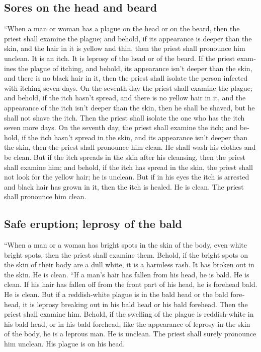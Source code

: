 \begin{paracol}{2}
\begin{otherlanguage}{english}
{\subsection{Sores on the head and
beard}\label{sores-on-the-head-and-beard}}

 ``When a man or woman has a plague on the head or on the
beard,  then the priest shall examine the plague; and
behold, if its appearance is deeper than the skin, and the hair in it is
yellow and thin, then the priest shall pronounce him unclean. It is an
itch. It is leprosy of the head or of the beard.  If the
priest examines the plague of itching, and behold, its appearance isn't
deeper than the skin, and there is no black hair in it, then the priest
shall isolate the person infected with itching seven days.
 On the seventh day the priest shall examine the plague;
and behold, if the itch hasn't spread, and there is no yellow hair in
it, and the appearance of the itch isn't deeper than the skin,
 then he shall be shaved, but he shall not shave the
itch. Then the priest shall isolate the one who has the itch seven more
days.  On the seventh day, the priest shall examine the
itch; and behold, if the itch hasn't spread in the skin, and its
appearance isn't deeper than the skin, then the priest shall pronounce
him clean. He shall wash his clothes and be clean.  But
if the itch spreads in the skin after his cleansing, 
then the priest shall examine him; and behold, if the itch has spread in
the skin, the priest shall not look for the yellow hair; he is unclean.
 But if in his eyes the itch is arrested and black hair
has grown in it, then the itch is healed. He is clean. The priest shall
pronounce him clean.

\hypertarget{safe-eruption-leprosy-of-the-bald}{%
\subsection{Safe eruption; leprosy of the
bald}\label{safe-eruption-leprosy-of-the-bald}}

 ``When a man or a woman has bright spots in the skin of
the body, even white bright spots,  then the priest shall
examine them. Behold, if the bright spots on the skin of their body are
a dull white, it is a harmless rash. It has broken out in the skin. He
is clean.  ``If a man's hair has fallen from his head, he
is bald. He is clean.  If his hair has fallen off from
the front part of his head, he is forehead bald. He is clean.
 But if a reddish-white plague is in the bald head or the
bald forehead, it is leprosy breaking out in his bald head or his bald
forehead.  Then the priest shall examine him. Behold, if
the swelling of the plague is reddish-white in his bald head, or in his
bald forehead, like the appearance of leprosy in the skin of the body,
 he is a leprous man. He is unclean. The priest shall
surely pronounce him unclean. His plague is on his head.


\end{otherlanguage}
\end{paracol}
